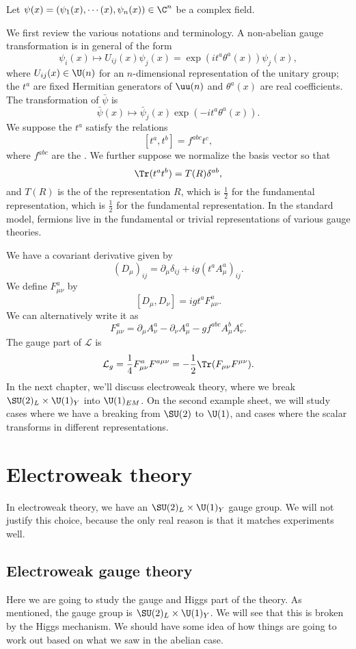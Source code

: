 \documentclass[a4paper]{article}
\begin{document}
Let $\psi(x) = (\psi_1(x), \cdots(x), \psi_n(x)) \in \C^n$ be a complex field. %

We first review the various notations and terminology. A non-abelian gauge transformation is in general of the form
\[
  \psi_i(x) \mapsto U_{ij}(x) \psi_j(x) = \exp(i t^a \theta^a(x)) \psi_j(x),
\]
where $U_{ij}(x) \in \U(n)$ for an $n$-dimensional representation of the unitary group; the $t^a$ are fixed Hermitian generators of $\uu(n)$ and $\theta^a(x)$ are real coefficients. The transformation of $\bar\psi$ is
\[
  \bar\psi(x) \mapsto \bar\psi_j (x) \exp(-i t^a \theta^a(x)).
\]
We suppose the $t^a$ satisfy the relations
\[
  [t^a, t^b] = f^{abc} t^c,
\]
where $f^{abc}$ are the . We further suppose we normalize the basis vector so that
\[
  \Tr (t^a t^b) = T(R) \delta^{ab},
\]
and $T(R)$ is the  of the representation $R$, which is $\frac{1}{2}$ for the fundamental representation, which is $\frac{1}{2}$ for the fundamental representation. In the standard model, fermions live in the fundamental or trivial representations of various gauge theories.

We have a covariant derivative given by
\[
  (D_\mu)_{ij} = \partial_\mu \delta_{ij} + i g(t^a A_\mu^a) _{ij}.
\]
We define $F_{\mu\nu}^a$ by
\[
  [D_\mu, D_\nu] = i g t^a F^a_{\mu\nu}.
\]
We can alternatively write it as
\[
  F_{\mu\nu}^a = \partial_\mu A_\nu^a - \partial_\nu A_\mu^a - g f^{abc} A_\mu^b A^c_\nu.
\]
The gauge part of $\mathcal{L}$ is 
\[
  \mathcal{L}_g = \frac{1}{4} F_{\mu\nu}^a F^{a\mu\nu} = - \frac{1}{2} \Tr (F_{\mu\nu} F^{\mu\nu}).
\]
In the next chapter, we'll discuss electroweak theory, where we break $\SU(2)_L \times \U(1)_Y$ into $\U(1)_{EM}$. On the second example sheet, we will study cases where we have a breaking from $\SU(2)$ to $\U(1)$, and cases where the scalar transforms in different representations.

\section{Electroweak theory}
In electroweak theory, we have an $\SU(2)_L \times \U(1)_Y$ gauge group. We will not justify this choice, because the only real reason is that it matches experiments well.
\subsection{Electroweak gauge theory}
Here we are going to study the gauge and Higgs part of the theory. As mentioned, the gauge group is $\SU(2)_L \times \U(1)_Y$. We will see that this is broken by the Higgs mechanism. We should have some idea of how things are going to work out based on what we saw in the abelian case.
\end{document}
